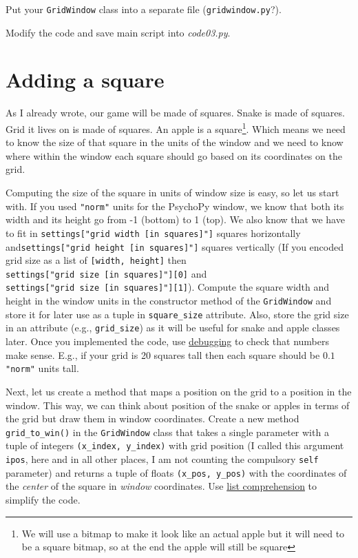 \documentclass[
]{book}
\begin{document}
Put your \texttt{GridWindow} class into a separate file (\texttt{gridwindow.py}?).

Modify the code and save main script into \emph{code03.py}.

\hypertarget{adding-a-square}{%
\section{Adding a square}\label{adding-a-square}}

As I already wrote, our game will be made of squares. Snake is made of squares. Grid it lives on is made of squares. An apple is a square\footnote{We will use a bitmap to make it look like an actual apple but it will need to be a square bitmap, so at the end the apple will still be square}. Which means we need to know the size of that square in the units of the window and we need to know where within the window each square should go based on its coordinates on the grid.

Computing the size of the square in units of window size is easy, so let us start with. If you used \texttt{"norm"} units for the PsychoPy window, we know that both its width and its height go from -1 (bottom) to 1 (top). We also know that we have to fit in \texttt{settings{[}"grid\ width\ {[}in\ squares{]}"{]}} squares horizontally and\texttt{settings{[}"grid\ height\ {[}in\ squares{]}"{]}} squares vertically (If you encoded grid size as a list of \texttt{{[}width,\ height{]}} then \texttt{settings{[}"grid\ size\ {[}in\ squares{]}"{]}{[}0{]}} and \texttt{settings{[}"grid\ size\ {[}in\ squares{]}"{]}{[}1{]}}). Compute the square width and height in the window units in the constructor method of the \texttt{GridWindow} and store it for later use as a tuple in \texttt{square\_size} attribute. Also, store the grid size in an attribute (e.g., \texttt{grid\_size}) as it will be useful for snake and apple classes later. Once you implemented the code, use \protect\hyperlink{debugging}{debugging} to check that numbers make sense. E.g., if your grid is 20 squares tall then each square should be \(0.1\) \texttt{"norm"} units tall.

Next, let us create a method that maps a position on the grid to a position in the window. This way, we can think about position of the snake or apples in terms of the grid but draw them in window coordinates. Create a new method \texttt{grid\_to\_win()} in the \texttt{GridWindow} class that takes a single parameter with a tuple of integers \texttt{(x\_index,\ y\_index)} with grid position (I called this argument \texttt{ipos}, here and in all other places, I am not counting the compulsory \texttt{self} parameter) and returns a tuple of floats \texttt{(x\_pos,\ y\_pos)} with the coordinates of the \emph{center} of the square in \emph{window} coordinates. Use \protect\hyperlink{list-comprehension}{list comprehension} to simplify the code.
\end{document}
